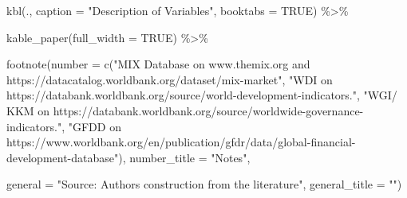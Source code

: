 \documentclass[a4paper,nobind]{templates/ociamthesis}
\newenvironment{Shaded}{\begin{snugshade}}{\end{snugshade}}
\newcommand{\AttributeTok}[1]{\textcolor[rgb]{0.77,0.63,0.00}{#1}}
\newcommand{\ConstantTok}[1]{\textcolor[rgb]{0.00,0.00,0.00}{#1}}
\newcommand{\FunctionTok}[1]{\textcolor[rgb]{0.00,0.00,0.00}{#1}}
\newcommand{\NormalTok}[1]{#1}
\newcommand{\SpecialCharTok}[1]{\textcolor[rgb]{0.00,0.00,0.00}{#1}}
\newcommand{\StringTok}[1]{\textcolor[rgb]{0.31,0.60,0.02}{#1}}
\renewenvironment{Shaded}
{
  \vspace{10pt}%
  \begin{snugshade}%
}{%
  \end{snugshade}%
  \vspace{8pt}%
}
\begin{document}
\begin{Shaded}
\begin{Highlighting}[]
  \FunctionTok{kbl}\NormalTok{(., }\AttributeTok{caption =} \StringTok{"Description of Variables"}\NormalTok{, }\AttributeTok{booktabs =} \ConstantTok{TRUE}\NormalTok{) }\SpecialCharTok{\%\textgreater{}\%} 
  
  \FunctionTok{kable\_paper}\NormalTok{(}\AttributeTok{full\_width =} \ConstantTok{TRUE}\NormalTok{) }\SpecialCharTok{\%\textgreater{}\%} 
  
  \FunctionTok{footnote}\NormalTok{(}\AttributeTok{number =} \FunctionTok{c}\NormalTok{(}\StringTok{"MIX Database on www.themix.org and https://datacatalog.worldbank.org/dataset/mix{-}market"}\NormalTok{, }\StringTok{"WDI on https://databank.worldbank.org/source/world{-}development{-}indicators."}\NormalTok{, }\StringTok{"WGI/ KKM on https://databank.worldbank.org/source/worldwide{-}governance{-}indicators."}\NormalTok{, }\StringTok{"GFDD on https://www.worldbank.org/en/publication/gfdr/data/global{-}financial{-}development{-}database"}\NormalTok{), }\AttributeTok{number\_title =} \StringTok{"Notes"}\NormalTok{,}
    
           \AttributeTok{general =} \StringTok{"Source: Authors\textquotesingle{} construction from the literature"}\NormalTok{,}
           \AttributeTok{general\_title =} \StringTok{""}\NormalTok{)}
\end{Highlighting}
\end{Shaded}
\end{document}
